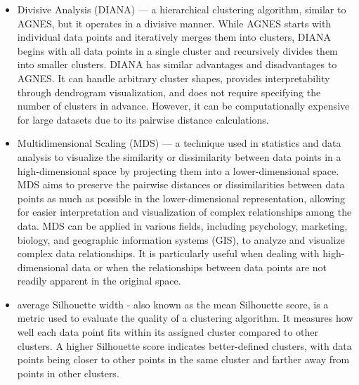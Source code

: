 \documentclass[11pt,a4paper]{article}\usepackage[]{graphicx}\usepackage[]{xcolor}
\begin{document}
\begin{itemize}
\item Divisive Analysis (DIANA) --- a hierarchical clustering algorithm, similar to AGNES, but it operates in a divisive manner. While AGNES starts with individual data points and iteratively merges them into clusters, DIANA begins with all data points in a single cluster and recursively divides them into smaller clusters. DIANA has similar advantages and disadvantages to AGNES. It can handle arbitrary cluster shapes, provides interpretability through dendrogram visualization, and does not require specifying the number of clusters in advance. However, it can be computationally expensive for large datasets due to its pairwise distance calculations.

\item Multidimensional Scaling (MDS) --- a technique used in statistics and data analysis to visualize the similarity or dissimilarity between data points in a high-dimensional space by projecting them into a lower-dimensional space. MDS aims to preserve the pairwise distances or dissimilarities between data points as much as possible in the lower-dimensional representation, allowing for easier interpretation and visualization of complex relationships among the data. MDS can be applied in various fields, including psychology, marketing, biology, and geographic information systems (GIS), to analyze and visualize complex data relationships. It is particularly useful when dealing with high-dimensional data or when the relationships between data points are not readily apparent in the original space.

\item average Silhouette width - also known as the mean Silhouette score, is a metric used to evaluate the quality of a clustering algorithm. It measures how well each data point fits within its assigned cluster compared to other clusters. A higher Silhouette score indicates better-defined clusters, with data points being closer to other points in the same cluster and farther away from points in other clusters.


\end{itemize}
\end{document}
